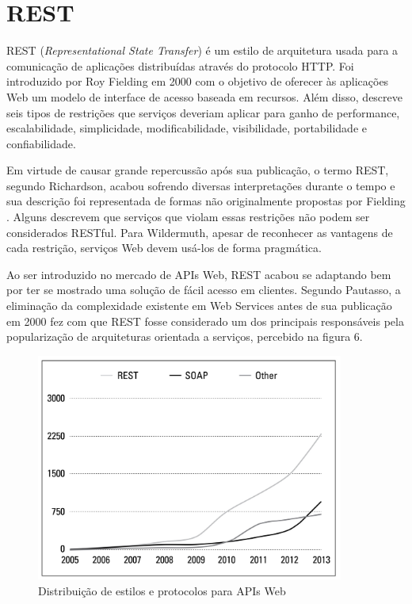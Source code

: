\section{REST}

REST (\textit{Representational State Transfer}) é um estilo de arquitetura usada para a comunicação de aplicações distribuídas através do protocolo HTTP. Foi introduzido por Roy Fielding em 2000 com o objetivo de oferecer às aplicações Web um modelo de interface de acesso baseada em recursos. Além disso, descreve seis tipos de restrições que serviços deveriam aplicar para ganho de performance, escalabilidade, simplicidade, modificabilidade, visibilidade, portabilidade e confiabilidade.

Em virtude de causar grande repercussão após sua publicação, o termo REST, segundo Richardson, acabou sofrendo diversas interpretações durante o tempo e sua descrição foi representada de formas não originalmente propostas por Fielding \cite{RichardsonEtAl2013}. Alguns descrevem que serviços que violam essas restrições não podem ser considerados RESTful. Para Wildermuth, apesar de reconhecer as vantagens de cada restrição, serviços Web devem usá-los de forma pragmática. \cite{Wildermuth2015}

Ao ser introduzido no mercado de APIs Web, REST acabou se adaptando bem por ter se mostrado uma solução de fácil acesso em clientes. Segundo Pautasso, a eliminação da complexidade existente em Web Services antes de sua publicação em 2000 fez com que REST fosse considerado um dos principais responsáveis pela popularização de arquiteturas orientada a serviços, percebido na figura 6. \cite{PautassoEtAl2008}

\begin{figure}[H]
  \centering    \includegraphics[width=0.9\textwidth,height=\textheight,keepaspectratio]{figuras/api-styles.jpg}
  \caption{Distribuição de estilos e protocolos para APIs Web}
\end{figure}

